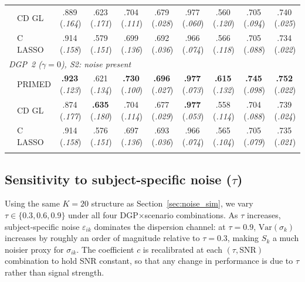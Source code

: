 \documentclass[referee,lineno,pdflatex,sn-vancouver-num]{sn-jnl}
\begin{document}
\begin{table}[h]
\begin{tabular*}{\textwidth}{@{\extracolsep\fill}ll cccc cccc}
& CD GL        & .889\,(\textit{.164}) & .623\,(\textit{.171}) & .704\,(\textit{.111}) & .679\,(\textit{.028}) & .977\,(\textit{.060}) & .560\,(\textit{.120}) & .705\,(\textit{.094}) & .740\,(\textit{.025}) \\
& C LASSO      & .914\,(\textit{.158}) & .579\,(\textit{.151}) & .699\,(\textit{.136}) & .692\,(\textit{.036}) & .966\,(\textit{.074}) & .566\,(\textit{.118}) & .705\,(\textit{.088}) & .734\,(\textit{.022}) \\
\midrule
\multicolumn{10}{l}{\textit{DGP~2 ($\gamma = 0$), S2: noise present}} \\[2pt]
& PRIMED & \textbf{.923}\,(\textit{.123}) & .621\,(\textit{.134}) & \textbf{.730}\,(\textit{.100}) & \textbf{.696}\,(\textit{.027}) & \textbf{.977}\,(\textit{.073}) & \textbf{.615}\,(\textit{.132}) & \textbf{.745}\,(\textit{.098}) & \textbf{.752}\,(\textit{.022}) \\
& CD GL        & .874\,(\textit{.177}) & \textbf{.635}\,(\textit{.180}) & .704\,(\textit{.114}) & .677\,(\textit{.029}) & \textbf{.977}\,(\textit{.053}) & .558\,(\textit{.114}) & .704\,(\textit{.088}) & .739\,(\textit{.024}) \\
& C LASSO      & .914\,(\textit{.158}) & .576\,(\textit{.151}) & .697\,(\textit{.136}) & .693\,(\textit{.036}) & .966\,(\textit{.074}) & .565\,(\textit{.104}) & .705\,(\textit{.079}) & .735\,(\textit{.021}) \\
\botrule
\end{tabular*}
\end{table}


\subsection{Sensitivity to subject-specific noise ($\tau$)}\label{sec:high_tau}

Using the same $K = 20$ structure as Section~\ref{sec:noise_sim}, we vary $\tau \in \{0.3, 0.6, 0.9\}$ under all four DGP$\times$scenario combinations.
As $\tau$ increases, subject-specific noise $\varepsilon_{ik}$ dominates the dispersion channel: at $\tau = 0.9$, $\mathrm{Var}(\sigma_k)$ increases by roughly an order of magnitude relative to $\tau = 0.3$, making $S_k$ a much noisier proxy for $\sigma_{ik}$.
The coefficient $c$ is recalibrated at each $(\tau, \mathrm{SNR})$ combination to hold SNR constant, so that any change in performance is due to $\tau$ rather than signal strength.
\end{document}
